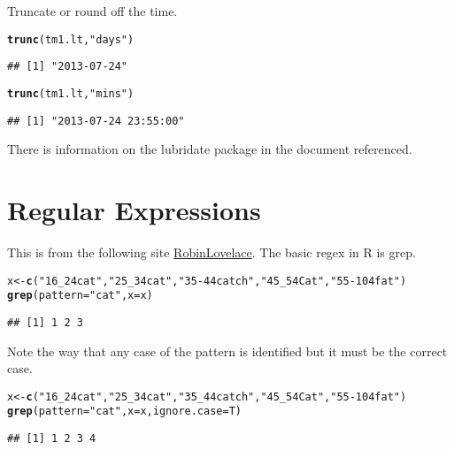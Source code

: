 \documentclass[12pt, a4paper, oneside]{article}\usepackage[]{graphicx}\usepackage[]{color}
\makeatletter
\newcommand{\hlstr}[1]{\textcolor[rgb]{0.192,0.494,0.8}{#1}}%
\newcommand{\hlstd}[1]{\textcolor[rgb]{0.345,0.345,0.345}{#1}}%
\newcommand{\hlkwb}[1]{\textcolor[rgb]{0.69,0.353,0.396}{#1}}%
\newcommand{\hlkwc}[1]{\textcolor[rgb]{0.333,0.667,0.333}{#1}}%
\newcommand{\hlkwd}[1]{\textcolor[rgb]{0.737,0.353,0.396}{\textbf{#1}}}%
\newenvironment{kframe}{%
 \def\at@end@of@kframe{}%
 \ifinner\ifhmode%
  \def\at@end@of@kframe{\end{minipage}}%
  \begin{minipage}{\columnwidth}%
 \fi\fi%
 \def\FrameCommand##1{\hskip\@totalleftmargin \hskip-\fboxsep
 \colorbox{shadecolor}{##1}\hskip-\fboxsep
     \hskip-\linewidth \hskip-\@totalleftmargin \hskip\columnwidth}%
 \MakeFramed {\advance\hsize-\width
   \@totalleftmargin\z@ \linewidth\hsize
   \@setminipage}}%
 {\par\unskip\endMakeFramed%
 \at@end@of@kframe}
\newenvironment{knitrout}{}{} %
\makeatother
\begin{document}
Truncate or round off the time. 
\begin{knitrout}
\color{fgcolor}\begin{kframe}
\begin{alltt}
\hlkwd{trunc}\hlstd{(tm1.lt,} \hlstr{"days"}\hlstd{)}
\end{alltt}
\begin{verbatim}
## [1] "2013-07-24"
\end{verbatim}
\begin{alltt}
\hlkwd{trunc}\hlstd{(tm1.lt,} \hlstr{"mins"}\hlstd{)}
\end{alltt}
\begin{verbatim}
## [1] "2013-07-24 23:55:00"
\end{verbatim}
\end{kframe}
\end{knitrout}

There is information on the lubridate package in the document referenced. 

\section{Regular Expressions}
This is from the following site \href{http://robinlovelace.net//r/2014/04/14/regex-in-R-RStudio.html}{RobinLovelace}.  The basic regex in R is grep. 

\begin{knitrout}
\color{fgcolor}\begin{kframe}
\begin{alltt}
\hlstd{x} \hlkwb{<-} \hlkwd{c}\hlstd{(}\hlstr{"16_24cat"}\hlstd{,} \hlstr{"25_34cat"}\hlstd{,} \hlstr{"35-44catch"}\hlstd{,} \hlstr{"45_54Cat"}\hlstd{,} \hlstr{"55-104fat"}\hlstd{)}
\hlkwd{grep}\hlstd{(}\hlkwc{pattern} \hlstd{=} \hlstr{"cat"}\hlstd{,} \hlkwc{x} \hlstd{= x)}
\end{alltt}
\begin{verbatim}
## [1] 1 2 3
\end{verbatim}
\end{kframe}
\end{knitrout}

Note the way that any case of the pattern is identified but it must be the correct case. 
\begin{knitrout}
\color{fgcolor}\begin{kframe}
\begin{alltt}
\hlstd{x} \hlkwb{<-} \hlkwd{c}\hlstd{(}\hlstr{"16_24cat"}\hlstd{,} \hlstr{"25_34cat"}\hlstd{,} \hlstr{"35_44catch"}\hlstd{,} \hlstr{"45_54Cat"}\hlstd{,} \hlstr{"55-104fat"}\hlstd{)}
\hlkwd{grep}\hlstd{(}\hlkwc{pattern} \hlstd{=} \hlstr{"cat"}\hlstd{,} \hlkwc{x} \hlstd{= x,} \hlkwc{ignore.case} \hlstd{= T)}
\end{alltt}
\begin{verbatim}
## [1] 1 2 3 4
\end{verbatim}
\end{kframe}
\end{knitrout}
\end{document}
